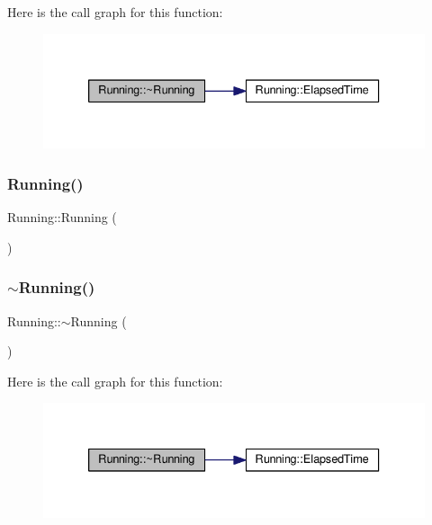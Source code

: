 Here is the call graph for this function\+:
\nopagebreak
\begin{figure}[H]
\begin{center}
\leavevmode
\includegraphics[width=333pt]{struct_running_a642965fca4984b52e6a65696380035ac_cgraph}
\end{center}
\end{figure}
\mbox{\label{struct_running_a4f9dd4f9c1b1ce72f2b65b13d9b4e65a}} 
\subsubsection{\texorpdfstring{Running()}{Running()}\hspace{0.1cm}{\footnotesize\ttfamily [2/2]}}
{\footnotesize\ttfamily Running\+::\+Running (\begin{DoxyParamCaption}{ }\end{DoxyParamCaption})\hspace{0.3cm}{\ttfamily [inline]}}

\mbox{\label{struct_running_a642965fca4984b52e6a65696380035ac}} 
\subsubsection{\texorpdfstring{$\sim$\+Running()}{~Running()}\hspace{0.1cm}{\footnotesize\ttfamily [2/2]}}
{\footnotesize\ttfamily Running\+::$\sim$\+Running (\begin{DoxyParamCaption}{ }\end{DoxyParamCaption})\hspace{0.3cm}{\ttfamily [inline]}}

Here is the call graph for this function\+:
\nopagebreak
\begin{figure}[H]
\begin{center}
\leavevmode
\includegraphics[width=333pt]{struct_running_a642965fca4984b52e6a65696380035ac_cgraph}
\end{center}
\end{figure}


